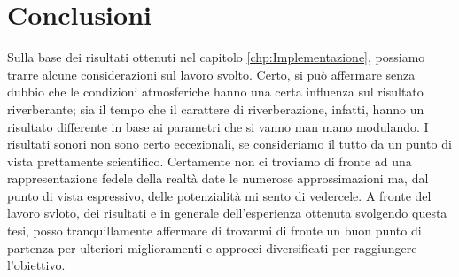 
\chapter{Conclusioni}
\label{chp:Conclusioni}
Sulla base dei risultati ottenuti nel capitolo \ref{chp:Implementazione}, possiamo trarre alcune 
considerazioni sul lavoro svolto.
Certo, si può affermare senza dubbio che le condizioni atmosferiche hanno una certa 
influenza sul risultato riverberante; sia il tempo che il carattere di riverberazione, infatti, hanno un 
risultato differente in base ai parametri che si vanno man mano modulando. I risultati sonori
non sono certo eccezionali, se consideriamo il tutto da un punto di vista prettamente scientifico.
Certamente non ci troviamo di fronte ad una rappresentazione fedele della realtà date le numerose 
approssimazioni ma, dal punto di vista espressivo, delle potenzialità mi sento di vedercele. A fronte 
del lavoro svloto, dei risultati e in generale dell'esperienza ottenuta svolgendo questa tesi, 
posso tranquillamente affermare di trovarmi di fronte un buon punto di partenza per ulteriori 
miglioramenti e approcci diversificati per raggiungere l'obiettivo.

